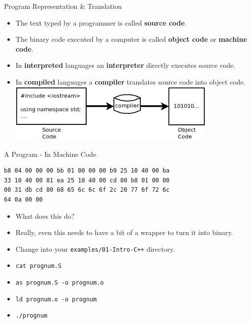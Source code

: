 \documentclass{beamer}
\begin{document}
\begin{frame}{Program Representation \& Translation}
    \begin{itemize}[<+->]
        \item The text typed by a programmer is called {\bf source
            code}.
        \item The binary code executed by a computer is called 
            {\bf object code} or {\bf machine code}.
        \item In {\bf interpreted} languages an {\bf interpreter} directly
            executes source code.
        \item In {\bf compiled} languages a {\bf compiler} translates source
            code into object code.
            \newline\includegraphics[width=0.8\textwidth]{images/compiler}
    \end{itemize}
\end{frame}

\begin{frame}[fragile]{A Program - In Machine Code}
\begin{verbatim}
b8 04 00 00 00 bb 01 00 00 00 b9 25 10 40 00 ba
33 10 40 00 81 ea 25 10 40 00 cd 80 b8 01 00 00
00 31 db cd 80 68 65 6c 6c 6f 2c 20 77 6f 72 6c
64 0a 00 00
\end{verbatim}

\begin{itemize}[<+(1)->]
    \item What does this do?
    \item Really, even this needs to have a bit of a wrapper to turn
    it into binary.
    \item Change into your {\tt examples/01-Intro-C++} directory.
    \item {\tt cat prognum.S}
    \item {\tt as prognum.S -o prognum.o}
    \item {\tt ld prognum.o -o prognum}
    \item {\tt ./prognum}
\end{itemize}
\end{frame}
\end{document}
